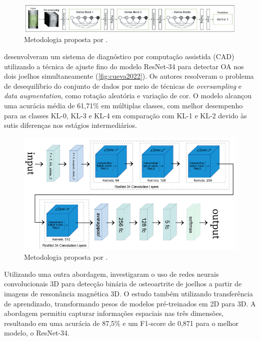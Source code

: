 \begin{figure}[h]
    \centering
    \includegraphics[width=\textwidth]{figs/domingues2023.png}
    \caption{Metodologia proposta por \cite{domingues2023}.}
    \label{fig:domingues2023}
\end{figure}

\cite{Cueva2022} desenvolveram um sistema de diagnóstico por computação assistida (CAD) utilizando a técnica de ajuste fino do modelo ResNet-34 para detectar OA nos dois joelhos simultaneamente (\autoref{fig:cueva2022}). Os autores resolveram o problema de desequilíbrio do conjunto de dados por meio de técnicas de \textit{oversampling} e \textit{data augmentation}, como rotação aleatória e variação de cor. O modelo alcançou uma acurácia média de 61,71\% em múltiplas classes, com melhor desempenho para as classes KL-0, KL-3 e KL-4 em comparação com KL-1 e KL-2 devido às sutis diferenças nos estágios intermediários.

\begin{figure}[h]
    \centering
    \includegraphics[width=\textwidth]{figs/cueva2022.png}
    \caption{Metodologia proposta por \cite{Cueva2022}.}
    \label{fig:cueva2022}
\end{figure}

Utilizando uma outra abordagem, \cite{yeoh2023} investigaram o uso de redes neurais convolucionais 3D para detecção binária de osteoartrite de joelhos a partir de imagens de ressonância magnética 3D. O estudo também utilizando transferência de aprendizado, transformando pesos de modelos pré-treinados em 2D para 3D. A abordagem permitiu capturar informações espaciais nas três dimensões, resultando em uma acurácia de 87,5\% e um F1-score de 0,871 para o melhor modelo, o ResNet-34.

